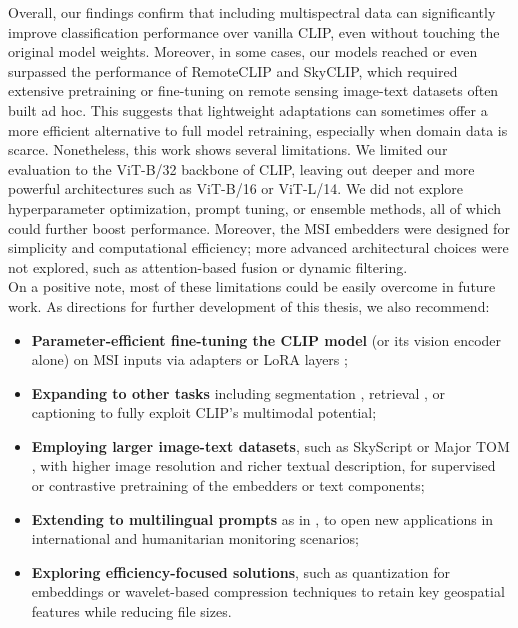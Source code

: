 \documentclass[a4paper, twoside, english]{sapthesis} %
\begin{document}
Overall, our findings confirm that including multispectral data can significantly improve classification performance over vanilla CLIP, even without touching the original model weights. Moreover, in some cases, our models reached or even surpassed the performance of RemoteCLIP and SkyCLIP, which required extensive pretraining or fine-tuning on remote sensing image-text datasets often built ad hoc. This suggests that lightweight adaptations can sometimes offer a more efficient alternative to full model retraining, especially when domain data is scarce.
Nonetheless, this work shows several limitations. We limited our evaluation to the ViT-B/32 backbone of CLIP, leaving out deeper and more powerful architectures such as ViT-B/16 or ViT-L/14. We did not explore hyperparameter optimization, prompt tuning, or ensemble methods, all of which could further boost performance. Moreover, the MSI embedders were designed for simplicity and computational efficiency; more advanced architectural choices were not explored, such as attention-based fusion or dynamic filtering. \\

On a positive note, most of these limitations could be easily overcome in future work. 
As directions for further development of this thesis, we also recommend:
\begin{itemize}
    \item \textbf{Parameter-efficient fine-tuning the CLIP model} (or its vision encoder alone) on MSI inputs via adapters or LoRA layers \cite{hu2021loralowrankadaptationlarge} \cite{xin2024parameter};
    \item \textbf{Expanding to other tasks} including segmentation \cite{luddecke2022image}, retrieval \cite{radford2021learning}, or captioning \cite{li2022blip} to fully exploit CLIP's multimodal potential;
    \item \textbf{Employing larger image-text datasets}, such as SkyScript \cite{wang2024skyscript} or Major TOM \cite{francis2024major}, with higher image resolution and richer textual description, for supervised or contrastive pretraining of the embedders or text components;
    \item \textbf{Extending to multilingual prompts} as in \cite{silva2024multilingual}, to open new applications in international and humanitarian monitoring scenarios;
    \item \textbf{Exploring efficiency-focused solutions}, such as quantization for embeddings \cite{jegou2010product} or wavelet-based compression techniques \cite{biswas2025wavelet} to retain key geospatial features while reducing file sizes.
\end{itemize}
\end{document}
